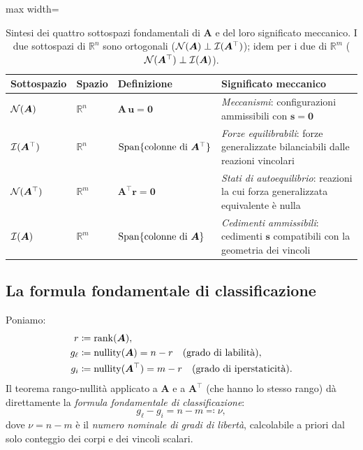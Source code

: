 \begin{table}[htbp]
	\centering
	\renewcommand{\arraystretch}{2.0}
	\small
	\begin{adjustbox}{max width=\textwidth}
		\begin{tabular}{
				>{\bfseries}p{3.4cm}
				p{1.5cm}
				p{4.2cm}
				p{4.3cm}}
			\toprule
			Sottospazio
			& Spazio
			& Definizione
			& Significato meccanico\\
			\midrule
			$\mathcal{N}(\bm{A})$
			& $\mathbb{R}^{n}$
			& $\bm{A}\,\bm{u} = \bm{0}$
			& \emph{Meccanismi}: configurazioni ammissibili
			con $\bm{s}=\bm{0}$\\
			$\mathcal{I}(\bm{A}^{\top})$
			& $\mathbb{R}^{n}$
			& $\operatorname{Span}\{\text{colonne di }\bm{A}^{\top}\}$
			& \emph{Forze equilibrabili}:
			forze generalizzate bilanciabili dalle reazioni vincolari\\
			\midrule
			$\mathcal{N}(\bm{A}^{\top})$
			& $\mathbb{R}^{m}$
			& $\bm{A}^{\top}\bm{r} = \bm{0}$
			& \emph{Stati di autoequilibrio}: reazioni la
			cui forza generalizzata equivalente è nulla\\
			$\mathcal{I}(\bm{A})$
			& $\mathbb{R}^{m}$
			& $\operatorname{Span}\{\text{colonne di }\bm{A}\}$
			& \emph{Cedimenti ammissibili}:
			cedimenti $\bm{s}$ compatibili con la geometria
			dei vincoli\\
			\bottomrule
		\end{tabular}
	\end{adjustbox}
	\caption{Sintesi dei quattro sottospazi fondamentali di $\bm{A}$
		e del loro significato meccanico.
		I due sottospazi di $\mathbb{R}^{n}$ sono ortogonali
		($\mathcal{N}(\bm{A}) \perp \mathcal{I}(\bm{A}^{\top})$);
		idem per i due di $\mathbb{R}^{m}$
		($\mathcal{N}(\bm{A}^\top) \perp \mathcal{I}(\bm{A})$).}
	\label{tab:quattro_sottospazi}
\end{table}



\subsection{La formula fondamentale di classificazione}
\label{sec:classificazione}

Poniamo:
\begin{align}
	r &\coloneqq \operatorname{rank}(\bm{A}), \label{eq:rango}\\
	g_\ell &\coloneqq \operatorname{nullity}(\bm{A}) = n - r
	\quad \text{(grado di labilità)},\label{eq:labilita}\\
	g_i &\coloneqq \operatorname{nullity}(\bm{A}^{\top}) = m - r
	\quad \text{(grado di iperstaticità)}.\label{eq:iperstaticita}
\end{align}
Il teorema rango-nullità applicato a $\bm{A}$ e a
$\bm{A}^{\top}$ (che hanno lo stesso rango) dà direttamente
la \emph{formula fondamentale di classificazione}:
\begin{equation}\label{eq:formula_class}
	\boxed{g_\ell - g_i 
		= n - m \eqqcolon \nu,}
\end{equation}
dove $\nu = n - m$ è il \emph{numero nominale di gradi
	di libertà}, calcolabile a priori dal solo conteggio dei
corpi e dei vincoli scalari.

